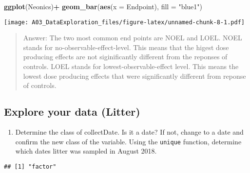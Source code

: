 \documentclass[]{article}
\newenvironment{Shaded}{\begin{snugshade}}{\end{snugshade}}
\newcommand{\CommentTok}[1]{\textcolor[rgb]{0.56,0.35,0.01}{\textit{#1}}}
\newcommand{\DataTypeTok}[1]{\textcolor[rgb]{0.13,0.29,0.53}{#1}}
\newcommand{\KeywordTok}[1]{\textcolor[rgb]{0.13,0.29,0.53}{\textbf{#1}}}
\newcommand{\NormalTok}[1]{#1}
\newcommand{\OperatorTok}[1]{\textcolor[rgb]{0.81,0.36,0.00}{\textbf{#1}}}
\newcommand{\StringTok}[1]{\textcolor[rgb]{0.31,0.60,0.02}{#1}}
\providecommand{\tightlist}{%
  \setlength{\itemsep}{0pt}\setlength{\parskip}{0pt}}
\begin{document}
\begin{Shaded}
\begin{Highlighting}[]
\KeywordTok{ggplot}\NormalTok{(Neonics)}\OperatorTok{+}
\StringTok{  }\KeywordTok{geom_bar}\NormalTok{(}\KeywordTok{aes}\NormalTok{(}\DataTypeTok{x =}\NormalTok{ Endpoint), }\DataTypeTok{fill =} \StringTok{"blue1"}\NormalTok{)}
\end{Highlighting}
\end{Shaded}

\texttt{[image: A03\_DataExploration\_files/figure-latex/unnamed-chunk-8-1.pdf]}

\begin{quote}
Answer: The two most common end points are NOEL and LOEL. NOEL stands
for no-observable-effect-level. This means that the higest dose
producing effects are not siginificantly different from the reponses of
controls. LOEL stands for lowest-observable-effect level. This means the
lowest dose producing effects that were significantly different from
reponse of controls.
\end{quote}

\hypertarget{explore-your-data-litter}{%
\subsection{Explore your data (Litter)}\label{explore-your-data-litter}}

\begin{enumerate}
\def\labelenumi{\arabic{enumi}.}
\setcounter{enumi}{11}
\tightlist
\item
  Determine the class of collectDate. Is it a date? If not, change to a
  date and confirm the new class of the variable. Using the
  \texttt{unique} function, determine which dates litter was sampled in
  August 2018.
\end{enumerate}

\begin{Shaded}
\end{Shaded}

\begin{verbatim}
## [1] "factor"
\end{verbatim}

\begin{Shaded}
\end{Shaded}
\end{document}
